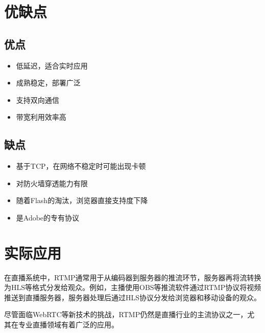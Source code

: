 \documentclass[12pt,UTF8]{ctexbook}
\begin{document}
\chapter{优缺点}

\section{优点}

\begin{itemize}
  \item 低延迟，适合实时应用
  \item 成熟稳定，部署广泛
  \item 支持双向通信
  \item 带宽利用效率高
\end{itemize}

\section{缺点}

\begin{itemize}
  \item 基于TCP，在网络不稳定时可能出现卡顿
  \item 对防火墙穿透能力有限
  \item 随着Flash的淘汰，浏览器直接支持度下降
  \item 是Adobe的专有协议
\end{itemize}

\chapter{实际应用}

在直播系统中，RTMP通常用于从编码器到服务器的推流环节，服务器再将流转换为HLS等格式分发给观众。例如，主播使用OBS等推流软件通过RTMP协议将视频推送到直播服务器，服务器处理后通过HLS协议分发给浏览器和移动设备的观众。

尽管面临WebRTC等新技术的挑战，RTMP仍然是直播行业的主流协议之一，尤其在专业直播领域有着广泛的应用。

\backmatter
\end{document}
